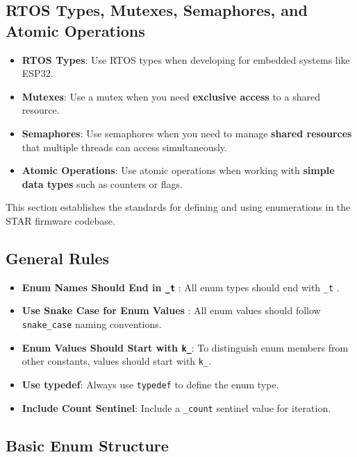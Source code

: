 \subsection{RTOS Types, Mutexes, Semaphores, and Atomic Operations
     }
      \begin{itemize}
    \item \textbf{RTOS Types}: Use RTOS types when developing for embedded systems like ESP32.
    \item \textbf{Mutexes}: Use a mutex when you need \textbf{exclusive access} to a shared resource.
    \item \textbf{Semaphores}: Use semaphores when you need to manage \textbf{shared resources} that multiple threads can access simultaneously.
    \item \textbf{Atomic Operations}: Use atomic operations when working with \textbf{simple data types} such as counters or flags.
\end{itemize}



This section establishes the standards for defining and using enumerations in the STAR firmware codebase.

\subsection{General Rules
   }

    \begin{itemize}
    \item \textbf{Enum Names Should End in \texttt{\_t}}
        : All enum types should end with \texttt{\_t}
              .
    \item \textbf{Use Snake Case for Enum Values
   }: All enum values should follow \texttt{snake\_case} naming conventions.
    \item \textbf{Enum Values Should Start with \texttt{k\_}}: To distinguish enum members from other constants, values should start with \texttt{k\_}.
    \item \textbf{Use typedef}: Always use \texttt{typedef} to define the enum type.
    \item \textbf{Include Count Sentinel}: Include a \texttt{\_count} sentinel value for iteration.
\end{itemize}

    \subsection{Basic Enum Structure}

